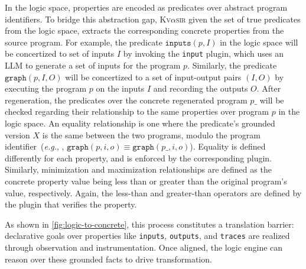\documentclass[nonacm,sigplan,review]{acmart}
\def\eg{{\em e.g.}, }
\newcommand{\sys}{{\scshape Kv{$\alpha$}sir}\xspace}
\newcommand{\ttt}[1]{\texttt{#1}\xspace}
\begin{document}
In the logic space, properties are encoded as predicates over abstract program
identifiers.
To bridge this abstraction gap, \sys given the set of true predicates
from the logic space, extracts the corresponding concrete properties from the
source program.
For example, the predicate $\ttt{inputs}(p, I)$ in the logic space
will be concertized to set of inputs $I$ by invoking the \ttt{input} plugin,
which uses an LLM to generate a set of inputs for the program $p$.
Similarly, the predicate $\ttt{graph}(p, I, O)$ will be concertized to a set of
input-output pairs $(I, O)$ by executing the program $p$ on the inputs $I$ and
recording the outputs $O$.
After regeneration, the predicates over the concrete regenerated program $p\_$
will be checked regarding their relationship to the same properties over program $p$
in the logic space.
An equality relationship is one where the predicate's grounded version
$X$ is the same between the two programs, modulo the program identifier~(\eg, $\ttt{graph}(p, i, o) \equiv \ttt{graph}(p\_, i, o)$).
Equality is defined differently for each property, and is enforced by the corresponding plugin.
Similarly, minimization and maximization relationships are defined as
the concrete property value being less than or greater than the original program's value, respectively.
Again, the less-than and greater-than operators are defined by the plugin that verifies the property.


As shown in \cref{fig:logic-to-concrete}, this process constitutes a
translation barrier: declarative goals over properties like \ttt{inputs},
\ttt{outputs}, and \ttt{traces} are realized through observation and
instrumentation. Once aligned, the logic engine can reason over these grounded
facts to drive transformation.
\end{document}
